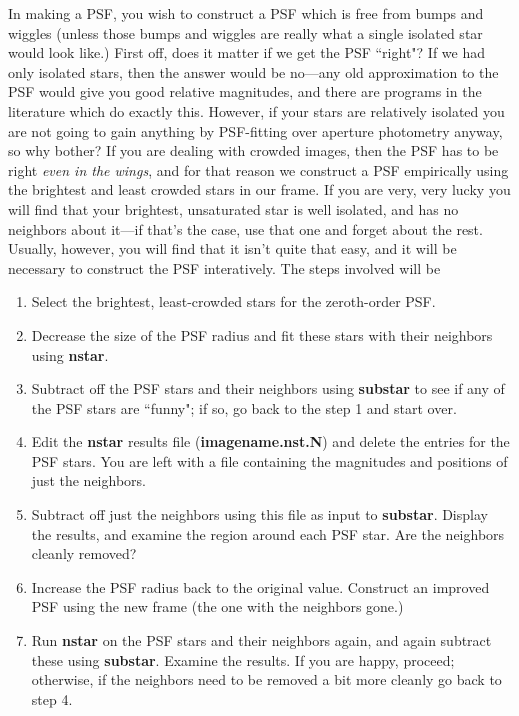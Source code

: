  
In making a PSF, you wish to
construct a PSF which is free from bumps and wiggles (unless those
bumps and wiggles are really what a single isolated star would look like.)
First off, does it matter if we get the PSF ``right"?  If we had
only isolated stars, then the answer would be no---any
old approximation to the PSF would give you
good relative magnitudes, and there are programs in the literature
which do exactly this.  However, if your stars are relatively isolated
you are not going to gain anything by PSF-fitting over aperture photometry
anyway, so why bother?  If you are dealing with crowded images, then the
PSF has to be right {\it even in the wings}, and for that reason we
construct a PSF empirically using the brightest and least crowded stars
in our frame.
If you are very, very
lucky you will find that your brightest, unsaturated star is well
isolated, and has no neighbors about it---if that's the case, use that
one and forget about the rest.  Usually, however, you will find that
it isn't quite that easy, and it will be necessary to construct the PSF
interatively.  The steps involved will be
\begin{enumerate}
	\item Select the brightest, least-crowded stars for the zeroth-order
	      PSF.
	\item Decrease the size of the PSF radius and fit these stars
	      with their neighbors using {\bf nstar}.  
	\item Subtract off the PSF stars and their neighbors using
	      {\bf substar} to see
	      if any of the PSF stars are ``funny"; if so, go back to
	      the step 1 and start over.
	\item Edit the {\bf nstar} results file ({\bf imagename.nst.N})
	      and delete the entries for the PSF stars.  You are left
	      with a file containing the magnitudes and positions of just
	      the neighbors.
	\item Subtract off just the neighbors using this file as input
	      to {\bf substar}.  Display
	      the results, and examine the region around each PSF star.
	      Are the neighbors cleanly removed?
	\item Increase the PSF radius back to the original value.
	      Construct an improved PSF using the new frame (the one with the
	      neighbors gone.)
        \item Run {\bf nstar} on the PSF stars and their neighbors again, and
	      again subtract these using {\bf substar}.  Examine the results.
	      If you are happy, proceed; otherwise, if the neighbors need
	      to be removed a bit more cleanly go back to step 4.  
\end{enumerate}
 

